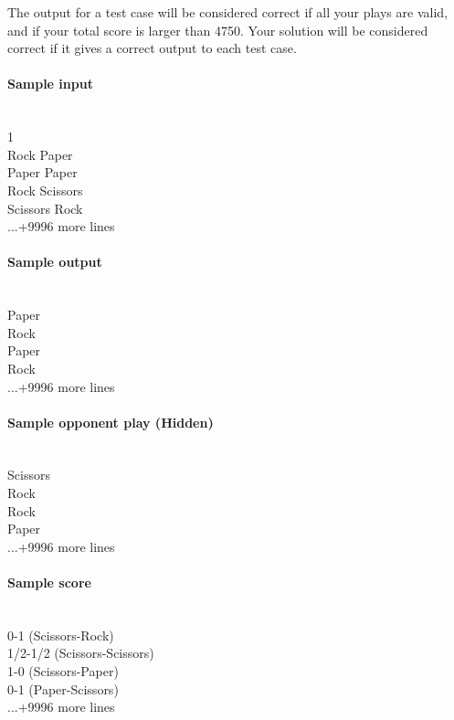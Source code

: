 \documentclass[11pt,a4paper,british]{article}
\begin{document}
The output for a test case will be considered correct if all your plays are valid, and if your total score is larger than 4750.
Your solution will be considered correct if it gives a correct output to each test case. 
\paragraph{Sample input}\ \\
1\\
Rock Paper\\
Paper Paper\\
Rock Scissors\\
Scissors Rock\\
...+9996 more lines\\

\paragraph{Sample output}\ \\
Paper\\
Rock\\
Paper\\
Rock\\
...+9996 more lines \\

\paragraph{Sample opponent play (Hidden)}\ \\
Scissors\\
Rock\\
Rock\\
Paper\\
...+9996 more lines\\

\paragraph{Sample score}\ \\
0-1 (Scissors-Rock)\\
1/2-1/2 (Scissors-Scissors)\\
1-0 (Scissors-Paper)\\
0-1 (Paper-Scissors)\\
...+9996 more lines \\
\end{document}
